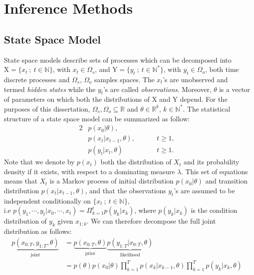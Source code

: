 \documentclass[12pt]{article}
\begin{document}
	\section{Inference Methods}
	\subsection{State Space Model}
	State space models describe sets of processes which can be decomposed into $\mathrm{X}=\{x_t \ ; \ t \in \mathbb{N}\}$, with $x_t \in \Omega_s$, and $\mathrm{Y}=\{y_t \ ; \ t \in \mathbb{N^*}\}$, with $y_t \in \Omega_o$, both time discrete processes and $\Omega_s$, $\Omega_o$ samples spaces. The $x_t$'s are unobserved and termed \emph{hidden states} while the $y_t$'s are called \emph{observations}. Moreover, $\theta$ is a vector of parameters on which both the distributions of $\mathrm{X}$ and $\mathrm{Y}$ depend. For the purposes of this dissertation, $\Omega_s, \Omega_o \subseteq \mathbb{R}$ and $\theta \in \mathbb{R}^k$, $k \in \mathbb{N^*}$. The statistical structure of a state space model can be summarized as follow: 
	\begin{alignat}{2}
	& p(x_0| \theta), &\\
	& p(x_t | x_{t-1}, \theta), \hspace{1cm} & t \ge 1,\\
	& p(y_t | x_t, \theta)  & t \ge 1.
	\end{alignat}
	Note that we denote by $p(x_t)$ both the distribution of $X_t$ and its probability density if it exists, with respect to a dominating measure $\lambda$. This set of equations means that $X_t$ is a Markov process of initial distribution $p(x_0| \theta)$ and transition distribution $p(x_t | x_{t-1}, \theta)$, and that the observations $y_t$'s are assumed to be independent conditionally on $\{x_t \ ; \ t \in \mathbb{N}\}$, \\ i.e $p(y_1, \cdots, y_t | x_0, \cdots, x_t) =\Pi_{k=1}^t p(y_k | x_k)$, where $p(y_k | x_k)$ is the condition distribution of $y_k$ given $x_{1:k}$. We can therefore decompose the full joint distribution as follows:
	\begin{align}
	\underbrace{p(x_{0:T}, y_{1:T}, \theta)}_{\text{joint}} & = \underbrace{p(x_{0:T}, \theta)}_{\text{prior}}\underbrace{p(y_{1:T}| x_{0:T}, \theta)}_{\text{likelihood}} \\
		& = p(\theta)p(x_0| \theta)\prod_{k=1}^{T}p(x_k|x_{k-1}, \theta)\prod_{k=1}^{T}p(y_k|x_k, \theta)
	\end{align}\\
	
\end{document}
